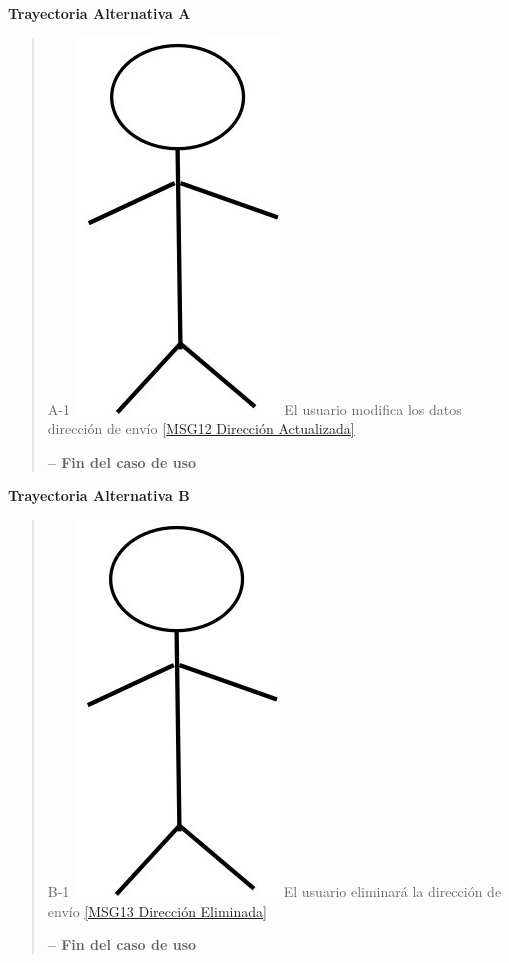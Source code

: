 \documentclass[14pt]{article}
\begin{document}
                \vspace{0.5cm}\textbf{Trayectoria Alternativa A}\label{CU-1.10 Trayectoria Alternativa A}
                    \begin{quote}
                        \item A-1  \includegraphics[height=0.02\textwidth]{Actor.jpg}
                            \label{Actor} El usuario modifica los datos dirección de envío \ref{MSG12 Dirección Actualizada}
                        
                        \vspace{0.3cm}\textbf{-- Fin del caso de uso}
                    \end{quote}
                   
                \vspace{0.5cm}\textbf{Trayectoria Alternativa B}\label{CU-1.10 Trayectoria Alternativa B}
                    \begin{quote}
                        \item B-1  \includegraphics[height=0.02\textwidth]{Actor.jpg}
                            \label{Actor} El usuario eliminará la dirección de envío \ref{MSG13 Dirección Eliminada}
                        
                        \vspace{0.3cm}\textbf{-- Fin del caso de uso}
                    \end{quote}
                
            \newpage    
\end{document}
